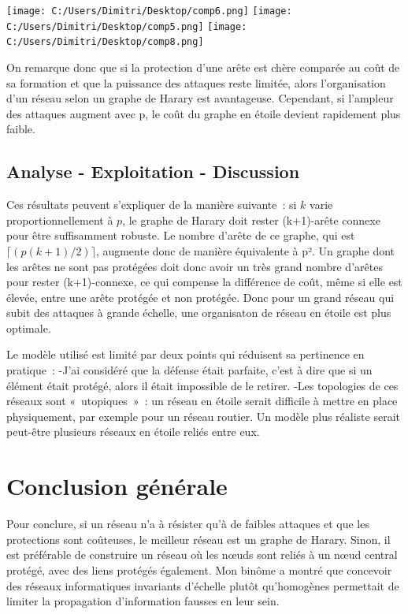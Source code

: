\documentclass[12pt,a4paper]{article}
\begin{document}
\begin{center}
\texttt{[image: C:/Users/Dimitri/Desktop/comp6.png]}
\texttt{[image: C:/Users/Dimitri/Desktop/comp5.png]}
\texttt{[image: C:/Users/Dimitri/Desktop/comp8.png]}
\end{center}

On remarque donc que si la protection d'une arête est chère comparée au coût de sa formation et que la puissance des attaques reste limitée, alors l'organisation d'un réseau selon un graphe de Harary est   avantageuse. Cependant, si l'ampleur des attaques augment avec p, le coût du graphe en étoile devient rapidement plus faible.



\subsection{Analyse - Exploitation - Discussion}
Ces résultats peuvent s'expliquer de la manière suivante : si $k$ varie proportionnellement à $p$, le graphe de Harary doit rester (k+1)-arête connexe pour être suffisamment robuste. Le nombre d'arête de ce graphe, qui est $\lceil (p(k+1)/2) \rceil$, augmente donc de manière équivalente à  p². Un graphe dont les arêtes ne sont pas protégées doit donc avoir un très grand nombre d'arêtes pour rester (k+1)-connexe, ce qui compense la différence de coût, même si elle est élevée, entre une arête protégée et non protégée. Donc pour un grand réseau qui subit des attaques à grande échelle, une organisaton de réseau en étoile est plus optimale.

Le modèle utilisé est limité par deux points qui réduisent sa pertinence en pratique :
	-J'ai considéré que la défense était parfaite, c'est à dire que si un élément était protégé, alors il était impossible de le retirer.
	-Les topologies de ces réseaux sont « utopiques » : un réseau en étoile serait difficile à mettre en place physiquement, par exemple pour un réseau routier. Un modèle plus réaliste serait peut-être plusieurs réseaux en étoile reliés entre eux.
	
\section{Conclusion générale}
Pour conclure, si un réseau n'a à résister qu'à de faibles attaques et que les protections sont coûteuses,  le meilleur réseau est un graphe de Harary. Sinon, il est préférable de construire un réseau où les nœuds sont reliés à un nœud central protégé, avec des liens protégés également. Mon binôme a montré que concevoir des réseaux informatiques invariants d'échelle plutôt qu'homogènes permettait de limiter la propagation d'information fausses en leur sein.
\end{document}
